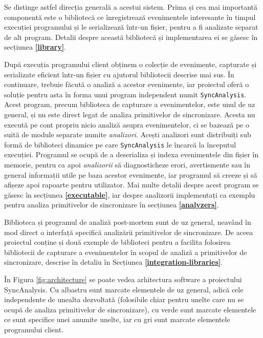 Se distinge astfel direcția generală a acestui sistem. Prima și cea mai
importantă componentă este o bibliotecă ce înregistrează evenimentele
interesante în timpul execuției programului și le serializează într-un
fișier, pentru a fi analizate separat de alt program. Detalii despre
această bibliotecă și implementarea ei se găsesc în secțiunea
\textbf{\ref{library}}.

După execuția programului client obținem o colecție de evenimente,
capturate și serializate eficient într-un fișier cu ajutorul
bibliotecii descrise mai sus. În continuare, trebuie făcută o analiză
a acestor evenimente, iar proiectul oferă o soluție pentru asta în forma
unui program independent numit \lstinline{SyncAnalysis}. Acest program,
precum biblioteca de capturare a evenimentelor, este unul de uz general,
și nu este direct legat de analiza primitivelor de sincronizare. Acesta
nu execută pe cont propriu nicio analiză asupra evenimentelor, ci se
bazează pe o suită de module separate numite \textit{analizori}. Acești
analizori sunt distribuiți sub formă de biblioteci dinamice pe care
\lstinline{SyncAnalysis} le încarcă la începutul execuției. Programul se
ocupă de a deserializa și indexa evenimentele din fișier în memorie,
pentru ca apoi \textit{analizorii} să diagnosticheze erori, avertismente
sau în general informații utile pe baza acestor evenimente, iar
programul să creeze și să afișeze apoi rapoarte pentru utilizator. Mai
multe detalii despre acest program se găsesc în secțiunea
\textbf{\ref{executable}}, iar despre analizorii implementați ca exemplu
pentru analiza primitivelor de sincronizare în secțiunea
\textbf{\ref{analyzers}}.

Biblioteca și programul de analiză post-mortem sunt de uz general,
neavând în mod direct o interfață specifică analizării primitivelor de
sincronizare. De aceea proiectul conține și două exemple de biblioteci
pentru a facilita folosirea bibliotecii de capturare a evenimentelor în
scopul de analiză a primitivelor de sincronizare, descrise în detaliu în
Secțiunea \textbf{\ref{integration-libraries}}.

În Figura \ref{fig:architecture} se poate vedea arhitectura software a
proiectului SyncAnalysis. Cu albastru sunt marcate elementele de uz
general, adică cele independente de unealta dezvoltată (folosibile chiar
pentru unelte care nu se ocupă de analiza primitivelor de sincronizare),
cu verde sunt marcate elementele ce sunt specifice unei anumite unelte,
iar cu gri sunt marcate elementele programului client.

